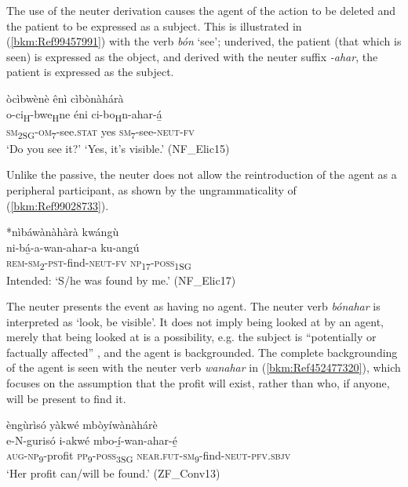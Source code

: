 The use of the neuter derivation causes the agent of the action to be deleted and the patient to be expressed as a subject. This is illustrated in (\ref{bkm:Ref99457991}) with the verb \textit{bón} ‘see’; underived, the patient (that which is seen) is expressed as the object, and derived with the neuter suffix \textit{-ahar}, the patient is expressed as the subject.

\ea
\label{bkm:Ref99457991}
òcìbwènè ênì cìbònàhárà\\
\gll o-ci\textsubscript{H}-bwe\textsubscript{H}ne    éni  ci-bo\textsubscript{H}n-ahar-á̲\\
\textsc{sm}\textsubscript{2SG}-\textsc{om}\textsubscript{7}-see.\textsc{stat}  yes  \textsc{sm}\textsubscript{7}-see-\textsc{neut}-\textsc{fv}\\
\glt ‘Do you see it?’ ‘Yes, it’s visible.’ (NF\_Elic15)
\z

Unlike the passive, the neuter does not allow the reintroduction of the agent as a peripheral participant, as shown by the ungrammaticality of (\ref{bkm:Ref99028733}).

\ea
\label{bkm:Ref99028733}
*nìbáwànàhàrà kwángù\\
ni-bá̲-a-wan-ahar-a    ku-angú\\
\textsc{rem}-\textsc{sm}\textsubscript{2}-\textsc{pst}-find-\textsc{neut}-\textsc{fv}  \textsc{np}\textsubscript{17}-\textsc{poss}\textsubscript{1SG}\\
Intended: ‘S/he was found by me.’ (NF\_Elic17)
\z

The neuter presents the event as having no agent. The neuter verb \textit{bónahar} is interpreted as ‘look, be visible’. It does not imply being looked at by an agent, merely that being looked at is a possibility, e.g. the subject is “potentially or factually affected” \citep[75]{Schadeberg2003}, and the agent is backgrounded. The complete backgrounding of the agent is seen with the neuter verb \textit{wanahar} in (\ref{bkm:Ref452477320}), which focuses on the assumption that the profit will exist, rather than who, if anyone, will be present to find it.

\ea
\label{bkm:Ref452477320}
èngùrìsó yàkwé mbòyíwànàhárè\\
\gll e-N-gurisó    i-akwé  mbo-í̲-wan-ahar-é̲\\
\textsc{aug}-\textsc{np}\textsubscript{9}-profit  \textsc{pp}\textsubscript{9}-\textsc{poss}\textsubscript{3SG}  \textsc{near}.\textsc{fut}-\textsc{sm}\textsubscript{9}-find-\textsc{neut}-\textsc{pfv}.\textsc{sbjv}\\
\glt ‘Her profit can/will be found.’ (ZF\_Conv13)
\z

